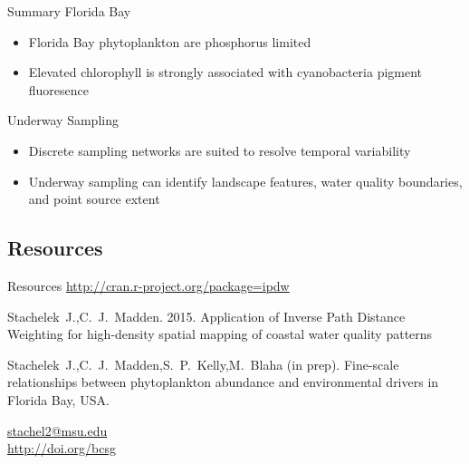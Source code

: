 \documentclass[compress,noflama,nosectionpages]{beamer}
\begin{document}
\begin{frame}{Summary}
\large
Florida Bay
\begin{itemize}
\item{Florida Bay phytoplankton are phosphorus limited}
\vspace{6pt}
\item{Elevated chlorophyll is strongly associated with cyanobacteria pigment fluoresence}
\end{itemize}

Underway Sampling
\begin{itemize}
\item{Discrete sampling networks are suited to resolve temporal variability}
\vspace{6pt}
\item{Underway sampling can identify landscape features, water quality boundaries, and point source extent}
\end{itemize}

\end{frame}

\subsection{Resources}
\begin{frame}{Resources}
  \centering
  \url{http://cran.r-project.org/package=ipdw}
  \begin{thebibliography}{10}
  \beamertemplatearticlebibitems
	Stachelek~J.,C.~J.~Madden. 2015. Application of Inverse Path Distance Weighting for high-density spatial mapping of coastal water quality patterns
	\newblock {}
	
	Stachelek~J.,C.~J.~Madden,S.~P.~Kelly,M.~Blaha (in prep). Fine-scale relationships between phytoplankton abundance and environmental drivers in Florida Bay, USA.
  \end{thebibliography}
  
  \vspace{3pt}
	\begin{center}
	\url{stachel2@msu.edu}\\
	\url{http://doi.org/bcsg}
	\end{center}
	\vspace{3pt}

\end{frame}
\end{document}
